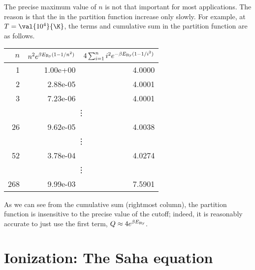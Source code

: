 \begin{sidebar}
The precise maximum value of $n$ is not that important for most applications. The reason is that the in the partition function increase only slowly. For example, at $T=\val{10^{4}}{\K}$, the terms and cumulative sum in the partition function are as follows.
\begin{center}
\begin{tabular}{rrr}
$n$ & $n^{2} e^{\beta E_{\mathrm{Ry}}(1-1/n^{2})}$ & $4\sum_{i=1}^{n} i^{2}e^{-\beta E_{\mathrm{Ry}}(1-1/i^{2})}$ \\
\hline
   1 & 1.00e+00 &  4.0000 \\
   2 & 2.88e-05 &  4.0001 \\
   3 & 7.23e-06 &  4.0001 \\
  \multicolumn{3}{c}{\vdots} \\
  26 & 9.62e-05 &  4.0038 \\
  \multicolumn{3}{c}{\vdots} \\
  52 & 3.78e-04 &  4.0274 \\
  \multicolumn{3}{c}{\vdots} \\
 268 & 9.99e-03 &  7.5901 \\
\end{tabular}
\end{center}
As we can see from the cumulative sum (rightmost column), the partition function is insensitive to the precise value of the cutoff; indeed, it is reasonably accurate to just use the first term, $Q\approx 4e^{\beta E_{\mathrm{Ry}}}$. 
\end{sidebar}

\section{Ionization: The Saha equation}
\label{s.saha-eqn}

